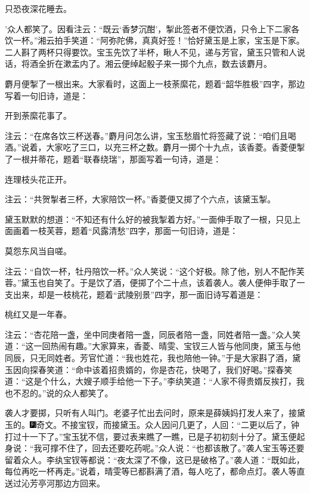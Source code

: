 只恐夜深花睡去。

'众人都笑了。因看注云：``既云`香梦沉酣'，掣此签者不便饮酒，只令上下二家各饮一杯。''湘云拍手笑道：``阿弥陀佛，真真好签！''恰好黛玉是上家，宝玉是下家。二人斟了两杯只得要饮。宝玉先饮了半杯，瞅人不见，递与芳官，黛玉只管和人说话，将酒全折在漱盂内了。湘云便绰起骰子来一掷个九点，数去该麝月。

麝月便掣了一根出来。大家看时，这面上一枝荼縻花，题着``韶华胜极''四字，那边写着一句旧诗，道是：

开到荼縻花事了。

注云：``在席各饮三杯送春。''麝月问怎么讲，宝玉愁眉忙将签藏了说：``咱们且喝酒。''说着，大家吃了三口，以充三杯之数。麝月一掷个十九点，该香菱。香菱便掣了一根并蒂花，题着``联春绕瑞''，那面写着一句诗，道是：

连理枝头花正开。

注云：``共贺掣者三杯，大家陪饮一杯。''香菱便又掷了个六点，该黛玉掣。

黛玉默默的想道：``不知还有什么好的被我掣着方好。''一面伸手取了一根，只见上面画着一枝芙蓉，题着``风露清愁''四字，那面一句旧诗，道是：

莫怨东风当自嗟。

注云：``自饮一杯，牡丹陪饮一杯。''众人笑说：``这个好极。除了他，别人不配作芙蓉。''黛玉也自笑了。于是饮了酒，便掷了个二十点，该着袭人。袭人便伸手取了一支出来，却是一枝桃花，题着``武陵别景''四字，那一面旧诗写着道是：

桃红又是一年春。

注云：``杏花陪一盏，坐中同庚者陪一盏，同辰者陪一盏，同姓者陪一盏。''众人笑道：``这一回热闹有趣。''大家算来，香菱、晴雯、宝钗三人皆与他同庚，黛玉与他同辰，只无同姓者。芳官忙道：``我也姓花，我也陪他一钟。''于是大家斟了酒，黛玉因向探春笑道：``命中该着招贵婿的，你是杏花，快喝了，我们好喝。''探春笑道：``这是个什么，大嫂子顺手给他一下子。''李纨笑道：``人家不得贵婿反挨打，我也不忍的。''说的众人都笑了。

袭人才要掷，只听有人叫门。老婆子忙出去问时，原来是薛姨妈打发人来了，接黛玉的。{\includegraphics[width=3mm]{../Images/00007}奇文。不接宝钗，而接黛玉。}众人因问几更了，人回：``二更以后了，钟打过十一下了。''宝玉犹不信，要过表来瞧了一瞧，已是子初初刻十分了。黛玉便起身说：``我可撑不住了，回去还要吃药呢。''众人说：``也都该散了。''袭人宝玉等还要留着众人。李纨宝钗等都说：``夜太深了不像，这已是破格了。''袭人道：``既如此，每位再吃一杯再走。''说着，晴雯等已都斟满了酒，每人吃了，都命点灯。袭人等直送过沁芳亭河那边方回来。


